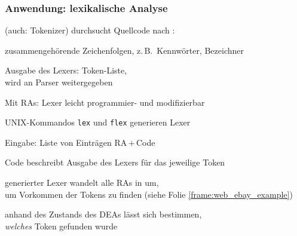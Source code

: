     \begin{frame}
      \frametitle{Anwendung: lexikalische Analyse}
      
      \begin{Itemize}
        \item
           (auch: Tokenizer) durchsucht Quellcode nach :
          \par%
          {\small zusammengehörende Zeichenfolgen, z.\,B.\ Kennwörter, Bezeichner}
          \par\smallskip
        \item
          Ausgabe des Lexers: Token-Liste,\\
          wird an Parser weitergegeben
          \par\smallskip
        \item
          Mit RAs: Lexer leicht programmier- und modifizierbar
          \par\smallskip
        \item<2->
          UNIX-Kommandos \texttt{lex} und \texttt{flex} generieren Lexer
          \begin{Itemize}
            \item
              Eingabe: Liste von Einträgen RA\,$+$\,Code
            \item
              Code beschreibt Ausgabe des Lexers für das jeweilige Token
            \item
              generierter Lexer wandelt alle RAs in  um,\\
              um Vorkommen der Tokens zu finden (siehe Folie \ref{frame:web_ebay_example})
            \item
              anhand des Zustands des DEAs lässt sich bestimmen,\\
              \emph{welches} Token gefunden wurde
          \end{Itemize}
      \end{Itemize}

    \end{frame}

